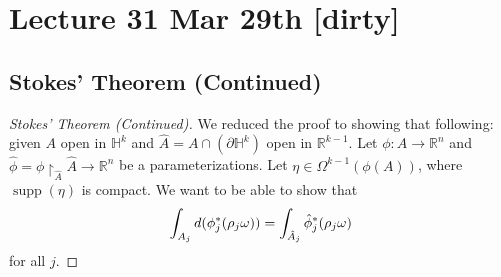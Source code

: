 \documentclass[notoc,notitlepage]{tufte-book}
\DeclareMathOperator{\supp}{supp}
\begin{document}


\chapter{Lecture 31 Mar 29th [dirty]}%
\label{chp:lecture_31_mar_29th}

\section{Stokes' Theorem (Continued)}%
\label{sec:stokes_theorem_continued}

\begin{proof}[Stokes' Theorem (Continued)]
  We reduced the proof to showing that following: given $A$ open in
  $\mathbb{H}^k$ and $\hat{A} = A \cap (\partial \mathbb{H}^k)$ open in
  $\mathbb{R}^{k-1}$. Let $\phi : A \to \mathbb{R}^n$ and $\hat{\phi} = \phi
  \restriction_{\hat{A}} \hat{A} \to \mathbb{R}^n$ be a parameterizations. Let
  $\eta \in \Omega^{k-1}(\phi(A))$, where $\supp(\eta)$ is compact. We want to
  be able to show that
  \begin{equation*}
    \int_{A_j} \mathop{}\!d{(\phi_j^*(\rho_j \omega))} = \int_{\hat{A}_j}
    \hat{\phi}_j^*(\rho_j \omega) 
  \end{equation*}
  for all $j$.


\end{proof}
\end{document}
